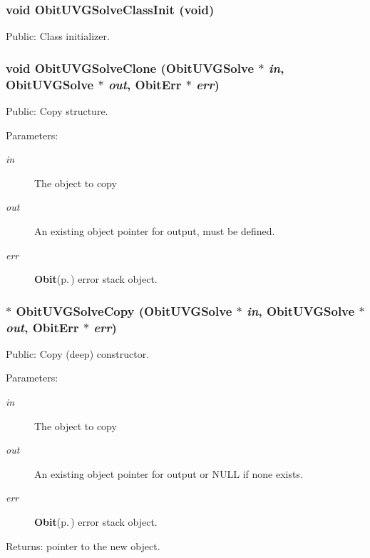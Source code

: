 \subsubsection{\setlength{\rightskip}{0pt plus 5cm}void Obit\-UVGSolve\-Class\-Init (void)}\label{ObitUVGSolve_8h_a4}


Public: Class initializer. 

\subsubsection{\setlength{\rightskip}{0pt plus 5cm}void Obit\-UVGSolve\-Clone ({\bf Obit\-UVGSolve} $\ast$ {\em in}, {\bf Obit\-UVGSolve} $\ast$ {\em out}, {\bf Obit\-Err} $\ast$ {\em err})}\label{ObitUVGSolve_8h_a9}


Public: Copy structure. 

\begin{Desc}
\item[Parameters:]
\begin{description}
\item[{\em in}]The object to copy \item[{\em out}]An existing object pointer for output, must be defined. \item[{\em err}]{\bf Obit}{\rm (p.\,\pageref{structObit})} error stack object. \end{description}
\end{Desc}
\subsubsection{$\ast$ Obit\-UVGSolve\-Copy ({\bf Obit\-UVGSolve} $\ast$ {\em in}, {\bf Obit\-UVGSolve} $\ast$ {\em out}, {\bf Obit\-Err} $\ast$ {\em err})}\label{ObitUVGSolve_8h_a8}


Public: Copy (deep) constructor. 

\begin{Desc}
\item[Parameters:]
\begin{description}
\item[{\em in}]The object to copy \item[{\em out}]An existing object pointer for output or NULL if none exists. \item[{\em err}]{\bf Obit}{\rm (p.\,\pageref{structObit})} error stack object. \end{description}
\end{Desc}
\begin{Desc}
\item[Returns:]pointer to the new object. \end{Desc}
